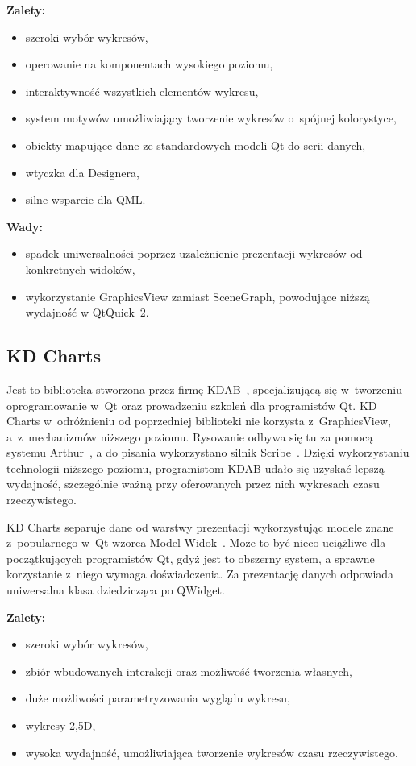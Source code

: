 \documentclass[11pt,twoside,a4paper,final]{llncs}
\begin{document}
\textbf{Zalety:}
\begin{itemize}
\item{szeroki wybór wykresów,}
\item{operowanie na komponentach wysokiego poziomu,}
\item{interaktywność wszystkich elementów wykresu,}
\item{system motywów umożliwiający tworzenie wykresów o~spójnej kolorystyce,}
\item{obiekty mapujące dane ze standardowych modeli Qt do serii danych,}
\item{wtyczka dla Designera,}
\item{silne wsparcie dla QML.}\newline
\end{itemize}

\textbf{Wady:}
\begin{itemize}
\item{spadek uniwersalności poprzez uzależnienie prezentacji wykresów od konkretnych widoków,}
\item{wykorzystanie GraphicsView zamiast SceneGraph, powodujące niższą wydajność w QtQuick~2.}
\end{itemize}


\subsection{KD Charts}
Jest to biblioteka stworzona przez firmę KDAB~\cite{kdab}, specjalizującą się w~tworzeniu oprogramowanie w~Qt oraz prowadzeniu szkoleń dla programistów Qt. KD Charts w~odróżnieniu od poprzedniej biblioteki nie korzysta z~GraphicsView, a~z~mechanizmów niższego poziomu. Rysowanie odbywa się tu za pomocą systemu Arthur~\cite{arthur}, a do pisania wykorzystano silnik Scribe~\cite{scribe}.
Dzięki wykorzystaniu technologii niższego poziomu, programistom KDAB udało się uzyskać lepszą wydajność, szczególnie ważną przy oferowanych przez nich wykresach czasu rzeczywistego.\newline

KD Charts separuje dane od warstwy prezentacji wykorzystując modele znane z~popularnego w~Qt wzorca Model-Widok~\cite{model-widok}. Może to być nieco uciążliwe dla początkujących programistów Qt, gdyż jest to obszerny system, a sprawne korzystanie z~niego wymaga doświadczenia.
Za prezentację danych odpowiada uniwersalna klasa dziedzicząca po QWidget.\newline

\textbf{Zalety:}
\begin{itemize}
\item{szeroki wybór wykresów,}
\item{zbiór wbudowanych interakcji oraz możliwość tworzenia własnych,}
\item{duże możliwości parametryzowania wyglądu wykresu,}
\item{wykresy 2,5D,}
\item{wysoka wydajność, umożliwiająca tworzenie wykresów czasu rzeczywistego.}\newline
\end{itemize}
\end{document}
